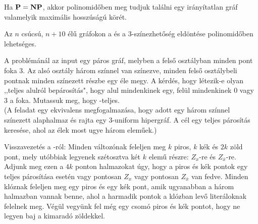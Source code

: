 

\begin{Exercise}[counter={sorszam}, difficulty=0]
	Ha $\mbox{\ensuremath{\mathbf{P}}} = \mbox{\ensuremath{\mathbf{NP}}}$, akkor polinomidőben meg tudjuk találni egy irányítatlan gráf valamelyik maximális hosszúságú körét.
\end{Exercise}


\begin{Exercise}[counter={sorszam}, difficulty=-1]
	 Az $n$ csúcsú, $n+10$ élű gráfokon a  és a 3-színezhetőség eldöntése polinomidőben lehetséges.
\end{Exercise}


\begin{Exercise}[counter={sorszam}, difficulty=0]
	A  problémánál az input egy páros gráf, melyben a fels\H o osztályban minden pont foka $3$. Az alsó osztály három színnel van színezve, minden fels\H o osztálybeli pontnak minden színezett részbe egy éle megy. A kérdés, hogy létezik-e olyan ,,teljes alulról bepárosítás", hogy alul mindenkinek egy, felül mindenkinek $0$ vagy $3$ a foka. Mutassuk meg, hogy  \NP-teljes.\\
	(A feladat egy ekvivalens megfogalmaz\'asa, hogy adott egy h\'arom sz\'innel sz\'inezett alaphalmaz \'es rajta egy $3$-uniform hipergr\'af. A c\'el egy teljes p\'aros\'it\'as keres\'ese, ahol az \'elek most ugye h\'arom elem\H uek.)
\end{Exercise}	
\begin{Answer}
	Visszavezet\'es a -r\'ol: Minden v\'altoz\'onak feleljen meg $k$ piros, $k$ k\'ek \'es $2k$ z\"old pont, mely ut\'obbiak legyenek sz\'etosztva k\'et $k$ elem\H u r\'eszre: $Z_x$-re \'es $Z_{\bar x}$-re. Adjunk meg ezen a $4k$ ponton halmazokat \'ugy, hogy a piros \'es k\'ek pontok egy teljes p\'aros\'it\'asa eset\'en vagy pontosan $Z_x$ vagy pontosan $Z_{\bar x}$ van fedve. Minden kl\'oznak feleljen meg egy piros \'es egy k\'ek pont, amik ugyanabban a h\'arom halmazban vannak benne, ahol a harmadik pontok a kl\'ozban lev\H o liter\'aloknak felelnek meg. V\'eg\"ul vegy\"unk fel m\'eg egy csom\'o piros \'es k\'ek pontot, hogy ne legyen baj a kimarad\'o z\"oldekkel.
\end{Answer}



